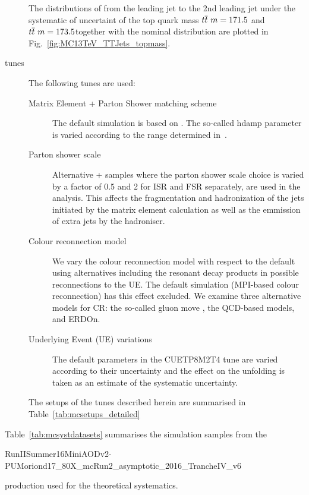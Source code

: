 \begin{description}
The distributions of \pullangle from the leading jet \leadingjet to the 2nd leading jet \scndleadingjet under the systematic of uncertaint of the top quark mass $t\overline{t}\ m=171.5$ and $t\overline{t}\ m=173.5$together with the nominal distribution are plotted in Fig.~\ref{fig:MC13TeV_TTJets_topmass}.

\item[\PYTHIA tunes] The following \PYTHIA tunes are used:
  
  \begin{description}
    
  \item[Matrix Element + Parton Shower matching scheme] The default simulation is based on \POWHEG. The so-called hdamp parameter is varied according to the range determined in~\cite{CMS-PAS-TOP-13-007}.

  \item[Parton shower scale] Alternative \POWHEG +  samples where the parton shower scale choice is varied by a factor of 0.5 and 2 for ISR and FSR separately, are used in the analysis. This affects the fragmentation and hadronization of the jets initiated by the matrix element calculation as well as the emmission of extra jets by the hadroniser.

  \item[Colour reconnection model] We vary the colour reconnection model with respect to the default using alternatives including the resonant decay products in possible reconnections to the UE. The default simulation (MPI-based colour reconnection) has this effect excluded. We examine three alternative models for CR: the so-called gluon move \cite{Argyropoulos:2014zoa}, the QCD-based models\cite{Christiansen:2015yqa}, and ERDOn. 

  \item[Underlying Event (UE) variations] The default parameters in the CUETP8M2T4 tune are varied according to their uncertainty and the effect on the unfolding is taken as an estimate of the systematic uncertainty.
  \end{description}
  The setups of the \PYTHIA tunes described herein are summarised in Table~\ref{tab:mcsetups_detailed}
\end{description}

Table~\ref{tab:mcsystdatasets} summarises the simulation samples from the

RunIISummer16MiniAODv2-PUMoriond17\_80X\_mcRun2\_asymptotic\_2016\_TrancheIV\_v6

production used for the theoretical systematics.

